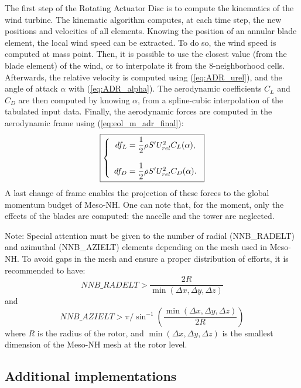 The first step of the Rotating Actuator Disc is to compute the kinematics of the wind turbine. The kinematic algorithm computes, at each time step, the new positions and velocities of all elements. 
Knowing the position of an annular blade element, the local wind speed can be extracted. To do so, the wind speed is computed at mass point. Then, it is possible to use the closest value (from the blade element) of the wind, or to interpolate it from the 8-neighborhood cells.
Afterwards, the relative velocity is computed using (\ref{eq:ADR_urel}), and the angle of attack $\alpha$ with (\ref{eq:ADR_alpha}). The aerodynamic coefficients $C_L$ and $C_D$ are then computed by knowing $\alpha$, from a spline-cubic interpolation of the tabulated input data. Finally, the aerodynamic forces are computed in the aerodynamic frame using (\ref{eq:eol_m_adr_final}): 
\begin{equation}
\label{eq:eol_m_alm_eff_num}	
\fbox{$
\left\lbrace
\begin{array}{ccc}	
df_{L} = \dfrac{1}{2} \rho S' U_{rel}^2 C_L(\alpha),
\\   
\\
df_{D} = \dfrac{1}{2} \rho S' U_{rel}^2 C_D(\alpha).
\\
\end{array}\right.
$}
\end{equation}	
A last change of frame enables the projection of these forces to the global momentum budget of Meso-NH. One can note that, for the moment, only the effects of the blades are computed: the nacelle and the tower are neglected. 

Note: Special attention must be given to the number of radial (NNB\_RADELT) and azimuthal (NNB\_AZIELT) elements depending on the mesh used in Meso-NH. To avoid gaps in the mesh and ensure a proper distribution of efforts, it is recommended to have:
\begin{equation}
NNB\_RADELT > \dfrac{2R}{\min(\Delta x, \Delta y, \Delta z)}
\end{equation}
and
\begin{equation}
NNB\_AZIELT > \pi / \sin^{-1} \left( \dfrac{\min(\Delta x, \Delta y, \Delta z)}{2R} \right)
\end{equation}
where $R$ is the radius of the rotor, and $\min(\Delta x, \Delta y, \Delta z)$ is the smallest dimension of the Meso-NH mesh at the rotor level.

\subsection{Additional implementations}
